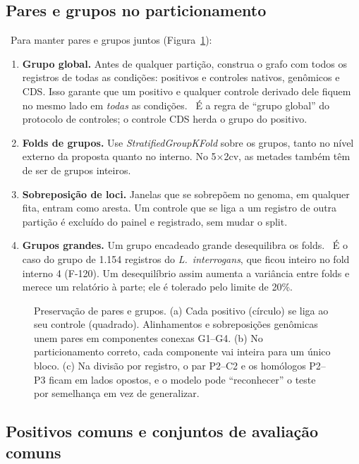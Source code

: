 \documentclass[11pt,a4paper]{article}
\newcommand{\etiqueta}[2]{\tcbox[on line, colback=#1!10, colframe=#1!75!black,
  boxrule=0.4pt, arc=1.2pt, left=1.5pt, right=1.5pt, top=0pt, bottom=0pt,
  fontupper=\sffamily\scriptsize\bfseries]{#2}}
\newcommand{\proj}{\etiqueta{oiGreen}{Projeto}}
\newcommand{\rec}{\etiqueta{oiVerm}{Recomendação}}
\begin{document}
\subsection{Pares e grupos no particionamento}

\rec\ Para manter pares e grupos juntos (Figura~\ref{fig:pares}):
\begin{enumerate}[leftmargin=1.4em]
\item \textbf{Grupo global.} Antes de qualquer partição, construa o grafo com todos os registros de todas as condições: positivos e controles nativos, genômicos e CDS. Isso garante que um positivo e qualquer controle derivado dele fiquem no mesmo lado em \emph{todas} as condições. \proj\ É a regra de ``grupo global'' do protocolo de controles; o controle CDS herda o grupo do positivo.
\item \textbf{Folds de grupos.} Use \emph{StratifiedGroupKFold} sobre os grupos, tanto no nível externo da proposta quanto no interno. No 5$\times$2cv, as metades também têm de ser de grupos inteiros.
\item \textbf{Sobreposição de loci.} Janelas que se sobrepõem no genoma, em qualquer fita, entram como aresta. Um controle que se liga a um registro de outra partição é excluído do painel e registrado, sem mudar o split.
\item \textbf{Grupos grandes.} Um grupo encadeado grande desequilibra os folds. \proj\ É o caso do grupo de 1.154 registros do \emph{L.\ interrogans}, que ficou inteiro no fold interno 4 (F-120). Um desequilíbrio assim aumenta a variância entre folds e merece um relatório à parte; ele é tolerado pelo limite de 20\%.
\end{enumerate}

\begin{figure}[t]
\centering

\caption{Preservação de pares e grupos. (a) Cada positivo (círculo) se liga ao seu controle (quadrado). Alinhamentos e sobreposições genômicas unem pares em componentes conexas G1--G4. (b) No particionamento correto, cada componente vai inteira para um único bloco. (c) Na divisão por registro, o par P2--C2 e os homólogos P2--P3 ficam em lados opostos, e o modelo pode ``reconhecer'' o teste por semelhança em vez de generalizar.}
\label{fig:pares}
\end{figure}

\subsection{Positivos comuns e conjuntos de avaliação comuns}
\end{document}
